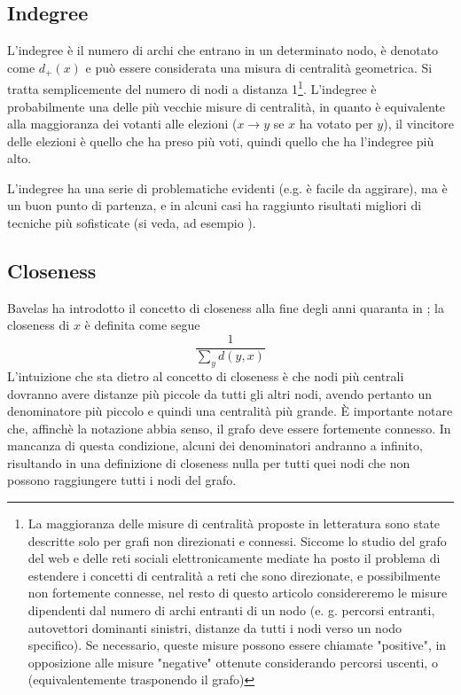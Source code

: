 \subsection{Indegree}
L'indegree è il numero di archi che entrano in un determinato nodo, è denotato come $d_+{(x)}$ e può essere considerata una misura di centralità geometrica. Si tratta semplicemente del numero di nodi a distanza 1\footnote{La maggioranza delle misure di centralità proposte in letteratura sono state descritte solo per grafi non direzionati e connessi. Siccome lo studio del grafo del web e delle reti sociali elettronicamente mediate ha posto il problema di estendere i concetti di centralità a reti che sono direzionate, e possibilmente non fortemente connesse, nel resto di questo articolo considereremo le misure dipendenti dal numero di archi entranti di un nodo (e. g. percorsi entranti, autovettori dominanti sinistri, distanze da tutti i nodi verso un nodo specifico). Se necessario, queste misure possono essere chiamate "positive", in opposizione alle misure "negative" ottenute considerando percorsi uscenti, o (equivalentemente trasponendo il grafo)}. L'indegree è probabilmente una delle più vecchie misure di centralità, in quanto è equivalente alla maggioranza dei votanti alle elezioni ($x \rightarrow y$ se $x$ ha votato per $y$), il vincitore delle elezioni è quello che ha preso più voti, quindi quello che ha l'indegree più alto.

L'indegree ha una serie di problematiche evidenti (e.g. è facile da aggirare), ma è un buon punto di partenza, e in alcuni casi ha raggiunto risultati migliori di tecniche più sofisticate (si veda, ad esempio \cite{degree}).
\subsection{Closeness}
Bavelas ha introdotto il concetto di closeness alla fine degli anni quaranta in \cite{bavelas}; la closeness di $x$ è definita come segue
\begin{equation}
	\frac{1}{\sum_y{d(y, x)}}
\end{equation}
L'intuizione che sta dietro al concetto di closeness è che nodi più centrali dovranno avere distanze più piccole da tutti gli altri nodi, avendo pertanto un denominatore più piccolo e quindi una centralità più grande. È importante notare che, affinchè la notazione abbia senso, il grafo deve essere fortemente connesso. In mancanza di questa condizione, alcuni dei denominatori andranno a infinito, risultando in una definizione di closeness nulla per tutti quei nodi che non possono raggiungere tutti i nodi del grafo.

